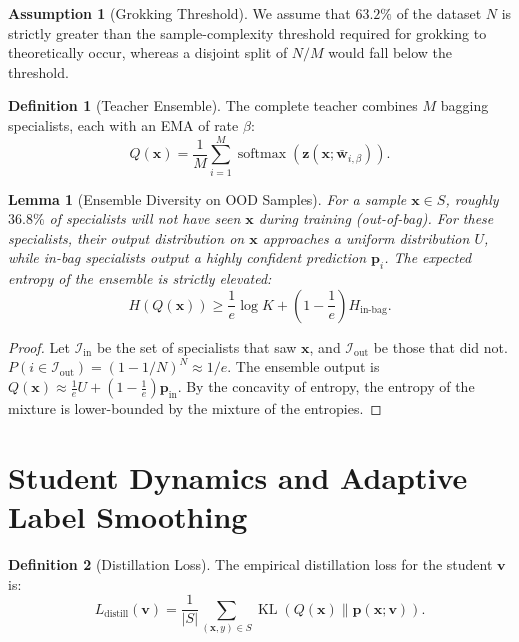 \documentclass[11pt,a4paper]{article}
\theoremstyle{definition}
\newtheorem{definition}{Definition}[section]
\newtheorem{assumption}{Assumption}[section]
\theoremstyle{plain}
\newtheorem{lemma}{Lemma}[section]
\theoremstyle{remark}
\DeclareMathOperator{\softmax}{softmax}
\DeclareMathOperator{\KL}{KL}
\newcommand{\w}{\mathbf{w}}
\newcommand{\vvec}{\mathbf{v}}
\newcommand{\x}{\mathbf{x}}
\newcommand{\z}{\mathbf{z}}
\newcommand{\p}{\mathbf{p}}
\begin{document}
\begin{assumption}[Grokking Threshold]
\label{ass:threshold}
We assume that $63.2\%$ of the dataset $N$ is strictly greater than the sample-complexity threshold required for grokking to theoretically occur, whereas a disjoint split of $N/M$ would fall below the threshold.
\end{assumption}

\begin{definition}[Teacher Ensemble]
\label{def:full-ensemble}
The complete teacher combines $M$ bagging specialists, each with an EMA of rate $\beta$:
\[
Q(\x) = \frac{1}{M} \sum_{i=1}^M \softmax(\z(\x; \bar{\w}_{i,\beta})).
\]
\end{definition}

\begin{lemma}[Ensemble Diversity on OOD Samples]
\label{lem:diversity}
For a sample $\x \in S$, roughly $36.8\%$ of specialists will not have seen $\x$ during training (out-of-bag). For these specialists, their output distribution on $\x$ approaches a uniform distribution $U$, while in-bag specialists output a highly confident prediction $\p_i$. The expected entropy of the ensemble is strictly elevated:
\[
H(Q(\x)) \geq \frac{1}{e} \log K + \left(1 - \frac{1}{e}\right) H_{\text{in-bag}}.
\]
\end{lemma}
\begin{proof}
Let $\mathcal{I}_{\text{in}}$ be the set of specialists that saw $\x$, and $\mathcal{I}_{\text{out}}$ be those that did not. $P(i \in \mathcal{I}_{\text{out}}) = (1 - 1/N)^N \approx 1/e$. 
The ensemble output is $Q(\x) \approx \frac{1}{e} U + (1 - \frac{1}{e}) \p_{\text{in}}$. By the concavity of entropy, the entropy of the mixture is lower-bounded by the mixture of the entropies.
\end{proof}

\section{Student Dynamics and Adaptive Label Smoothing}
\label{sec:student}

\begin{definition}[Distillation Loss]
\label{def:distill-loss}
The empirical distillation loss for the student $\vvec$ is:
\[
L_{\text{distill}}(\vvec) = \frac{1}{|S|} \sum_{(\x,y) \in S} \KL(Q(\x) \| \p(\x; \vvec)).
\]
\end{definition}
\end{document}
